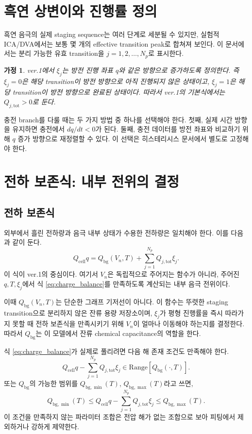 \documentclass[11pt,a4paper]{article}
\newtheorem*{assumption}{가정}
\newcommand{\bg}{\mathrm{bg}}
\newcommand{\cell}{\mathrm{cell}}
\newcommand{\tot}{\mathrm{tot}}
\begin{document}
\section{흑연 상변이와 진행률 정의}
흑연 음극의 실제 staging sequence는 여러 단계로 세분될 수 있지만, 실험적 ICA/DVA에서는 보통 몇 개의 effective transition peak로 합쳐져 보인다. 이 문서에서는 분리 가능한 유효 transition을 \(j=1,2,\ldots,N_p\)로 표시한다.

\begin{assumption}
ver.1에서 \(\xi_j\)는 방전 진행 좌표 \(q\)와 같은 방향으로 증가하도록 정의한다. 즉 \(\xi_j=0\)은 해당 transition이 방전 방향으로 아직 진행되지 않은 상태이고, \(\xi_j=1\)은 해당 transition이 방전 방향으로 완료된 상태이다. 따라서 ver.1의 기본식에서는 \(Q_{j,\tot}>0\)로 둔다.
\end{assumption}

충전 branch를 다룰 때는 두 가지 방법 중 하나를 선택해야 한다. 첫째, 실제 시간 방향을 유지하면 충전에서 \(dq/dt<0\)가 된다. 둘째, 충전 데이터를 방전 좌표와 비교하기 위해 \(q\) 증가 방향으로 재정렬할 수 있다. 이 선택은 히스테리시스 문서에서 별도로 고정해야 한다.

\section{전하 보존식: 내부 전위의 결정}
\subsection{전하 보존식}
외부에서 흘린 전하량과 음극 내부 상태가 수용한 전하량은 일치해야 한다. 이를 다음과 같이 둔다.
\begin{equation}
\boxed{
Q_{\cell}q=Q_{\bg}(V_n,T)+\sum_{j=1}^{N_p}Q_{j,\tot}\xi_j.
}
\label{eq:charge_balance}
\end{equation}
이 식이 ver.1의 중심이다. 여기서 \(V_n\)은 독립적으로 주어지는 함수가 아니라, 주어진 \(q,T,\xi_j\)에서 식 \eqref{eq:charge_balance}를 만족하도록 계산되는 내부 음극 전위이다.

이때 \(Q_{\bg}(V_n,T)\)는 단순한 그래프 기저선이 아니다. 이 함수는 뚜렷한 staging transition으로 분리하지 않은 잔류 용량 저장소이며, \(\xi_j\)가 평형 진행률을 즉시 따라가지 못할 때 전하 보존식을 만족시키기 위해 \(V_n\)이 얼마나 이동해야 하는지를 결정한다. 따라서 \(Q_{\bg}\)는 이 모델에서 잔류 chemical capacitance의 역할을 한다.

식 \eqref{eq:charge_balance}가 실제로 풀리려면 다음 해 존재 조건도 만족해야 한다.
\begin{equation}
Q_{\cell}q-\sum_{j=1}^{N_p}Q_{j,\tot}\xi_j
\in
\mathrm{Range}\left[Q_{\bg}(\cdot,T)\right].
\label{eq:solution_existence}
\end{equation}
또는 \(Q_{\bg}\)의 가능한 범위를 \(Q_{\bg,\min}(T)\), \(Q_{\bg,\max}(T)\)라고 쓰면,
\begin{equation}
Q_{\bg,\min}(T)
\le
Q_{\cell}q-\sum_{j=1}^{N_p}Q_{j,\tot}\xi_j
\le
Q_{\bg,\max}(T).
\end{equation}
이 조건을 만족하지 않는 파라미터 조합은 전압 해가 없는 조합으로 보아 피팅에서 제외하거나 강하게 제약한다.
\end{document}
